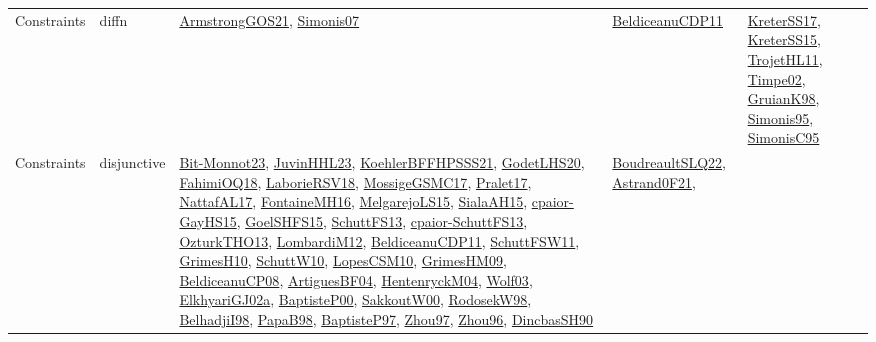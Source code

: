 {\begin{longtable}{lp{3cm}>{\raggedright}p{6cm}>{\raggedright}p{6cm}p{8cm}}
Constraints & diffn & \href{papers/ArmstrongGOS21.pdf}{ArmstrongGOS21}\cite{ArmstrongGOS21}, \href{articles/Simonis07.pdf}{Simonis07}\cite{Simonis07} & \href{articles/BeldiceanuCDP11.pdf}{BeldiceanuCDP11}\cite{BeldiceanuCDP11} & \href{articles/KreterSS17.pdf}{KreterSS17}\cite{KreterSS17}, \href{papers/KreterSS15.pdf}{KreterSS15}\cite{KreterSS15}, \href{articles/TrojetHL11.pdf}{TrojetHL11}\cite{TrojetHL11}, \href{articles/Timpe02.pdf}{Timpe02}\cite{Timpe02}, \href{papers/GruianK98.pdf}{GruianK98}\cite{GruianK98}, \href{papers/Simonis95.pdf}{Simonis95}\cite{Simonis95}, \href{papers/SimonisC95.pdf}{SimonisC95}\cite{SimonisC95}\\
Constraints & disjunctive & \href{papers/Bit-Monnot23.pdf}{Bit-Monnot23}\cite{Bit-Monnot23}, \href{papers/JuvinHHL23.pdf}{JuvinHHL23}\cite{JuvinHHL23}, \href{articles/KoehlerBFFHPSSS21.pdf}{KoehlerBFFHPSSS21}\cite{KoehlerBFFHPSSS21}, \href{papers/GodetLHS20.pdf}{GodetLHS20}\cite{GodetLHS20}, \href{articles/FahimiOQ18.pdf}{FahimiOQ18}\cite{FahimiOQ18}, \href{articles/LaborieRSV18.pdf}{LaborieRSV18}\cite{LaborieRSV18}, \href{papers/MossigeGSMC17.pdf}{MossigeGSMC17}\cite{MossigeGSMC17}, \href{papers/Pralet17.pdf}{Pralet17}\cite{Pralet17}, \href{articles/NattafAL17.pdf}{NattafAL17}\cite{NattafAL17}, \href{papers/FontaineMH16.pdf}{FontaineMH16}\cite{FontaineMH16}, \href{papers/MelgarejoLS15.pdf}{MelgarejoLS15}\cite{MelgarejoLS15}, \href{papers/SialaAH15.pdf}{SialaAH15}\cite{SialaAH15}, \href{papers/cpaior-GayHS15.pdf}{cpaior-GayHS15}\cite{cpaior-GayHS15}, \href{articles/GoelSHFS15.pdf}{GoelSHFS15}\cite{GoelSHFS15}, \href{papers/SchuttFS13.pdf}{SchuttFS13}\cite{SchuttFS13}, \href{papers/cpaior-SchuttFS13.pdf}{cpaior-SchuttFS13}\cite{cpaior-SchuttFS13}, \href{articles/OzturkTHO13.pdf}{OzturkTHO13}\cite{OzturkTHO13}, \href{articles/LombardiM12.pdf}{LombardiM12}\cite{LombardiM12}, \href{articles/BeldiceanuCDP11.pdf}{BeldiceanuCDP11}\cite{BeldiceanuCDP11}, \href{articles/SchuttFSW11.pdf}{SchuttFSW11}\cite{SchuttFSW11}, \href{papers/GrimesH10.pdf}{GrimesH10}\cite{GrimesH10}, \href{papers/SchuttW10.pdf}{SchuttW10}\cite{SchuttW10}, \href{articles/LopesCSM10.pdf}{LopesCSM10}\cite{LopesCSM10}, \href{papers/GrimesHM09.pdf}{GrimesHM09}\cite{GrimesHM09}, \href{papers/BeldiceanuCP08.pdf}{BeldiceanuCP08}\cite{BeldiceanuCP08}, \href{papers/ArtiguesBF04.pdf}{ArtiguesBF04}\cite{ArtiguesBF04}, \href{papers/HentenryckM04.pdf}{HentenryckM04}\cite{HentenryckM04}, \href{papers/Wolf03.pdf}{Wolf03}\cite{Wolf03}, \href{papers/ElkhyariGJ02a.pdf}{ElkhyariGJ02a}\cite{ElkhyariGJ02a}, \href{articles/BaptisteP00.pdf}{BaptisteP00}\cite{BaptisteP00}, \href{articles/SakkoutW00.pdf}{SakkoutW00}\cite{SakkoutW00}, \href{papers/RodosekW98.pdf}{RodosekW98}\cite{RodosekW98}, \href{articles/BelhadjiI98.pdf}{BelhadjiI98}\cite{BelhadjiI98}, \href{articles/PapaB98.pdf}{PapaB98}\cite{PapaB98}, \href{papers/BaptisteP97.pdf}{BaptisteP97}\cite{BaptisteP97}, \href{articles/Zhou97.pdf}{Zhou97}\cite{Zhou97}, \href{papers/Zhou96.pdf}{Zhou96}\cite{Zhou96}, \href{articles/DincbasSH90.pdf}{DincbasSH90}\cite{DincbasSH90} & \href{papers/BoudreaultSLQ22.pdf}{BoudreaultSLQ22}\cite{BoudreaultSLQ22}, \href{papers/Astrand0F21.pdf}{Astrand0F21}\cite{Astrand0F21}, 
\end{longtable}}

